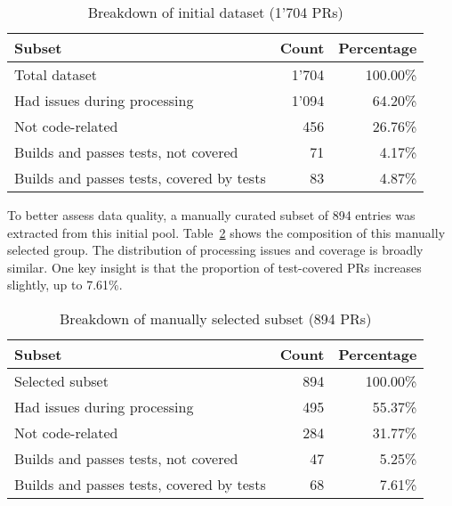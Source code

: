 \begin{table}[ht]
	\centering
	\begin{tabular}{lrr}
		\toprule
		\textbf{Subset}                                        & \textbf{Count} & \textbf{Percentage} \\
		\midrule
		Total dataset                                          & 1'704           & 100.00\%            \\
		Had issues during processing                           & 1'094           & 64.20\%             \\
		Not code-related                                       & 456            & 26.76\%             \\
		Builds and passes tests, not covered                   & 71             & 4.17\%              \\
		Builds and passes tests, covered by tests\footnotemark & 83             & 4.87\%              \\
		\bottomrule
	\end{tabular}
	\caption{Breakdown of initial dataset (1'704 PRs)}
	\label{tab:initial-distribution}
\end{table}


To better assess data quality, a manually curated subset of 894 entries was extracted from this
initial pool. Table~\ref{tab:manual-selection-distribution} shows the composition of this manually
selected group. The distribution of processing issues and coverage is broadly similar. One key
insight is that the proportion of test-covered PRs increases slightly, up to 7.61\%.

\begin{table}[ht]
	\centering
	\begin{tabular}{lrr}
		\toprule
		\textbf{Subset}                           & \textbf{Count} & \textbf{Percentage} \\
		\midrule
		Selected subset                           & 894            & 100.00\%            \\
		Had issues during processing              & 495            & 55.37\%             \\
		Not code-related                          & 284            & 31.77\%             \\
		Builds and passes tests, not covered      & 47             & 5.25\%              \\
		Builds and passes tests, covered by tests & 68             & 7.61\%              \\
		\bottomrule
	\end{tabular}
	\caption{Breakdown of manually selected subset (894 PRs)}
	\label{tab:manual-selection-distribution}
\end{table}


